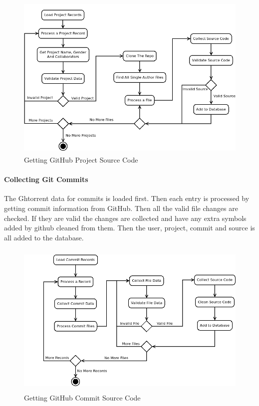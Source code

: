 \documentclass{article}
\begin{document}
\begin{figure}[!h]
    \centering
    \includegraphics[height=8cm]{diagrams/projects.png}
    \caption{Getting GitHub Project Source Code}
\end{figure}

\paragraph{Collecting Git Commits}
The Ghtorrent data for commits is loaded first. Then each entry is processed by getting commit information from GitHub. Then all the valid file changes are checked. If they are valid the changes are collected and have any extra symbols added by github cleaned from them. Then the user, project, commit and source is all added to the database.

\begin{figure}[!h]
    \centering
    \includegraphics[height=7.5cm]{diagrams/commits.png}
    \caption{Getting GitHub Commit Source Code}
\end{figure}
\end{document}
